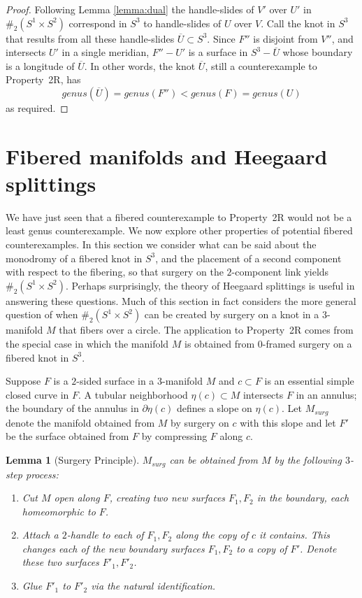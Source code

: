 \documentclass{amsart}
\newtheorem{lemma}[thm]{Lemma}
\newcommand{\bdd}{\mbox{$\partial$}}
\begin{document}
\begin{proof}
Following Lemma \ref{lemma:dual} the handle-slides of $V'$ over $U'$ in $\#_{2} (S^{1} \times S^{2})$ correspond in $S^3$ to handle-slides of $U$ over $V$.  Call the knot in $S^3$ that results from all these handle-slides $\overline{U} \subset S^3$.  Since $F''$ is disjoint from $V''$, and intersects $U'$ in a single meridian, $F'' - U'$ is a surface in $S^3 - \overline{U}$ whose boundary is a longitude of $\overline{U}$.  In other words, the knot $\overline{U}$, still a counterexample to Property~2R, has $$genus(\overline{U}) = genus(F'') < genus(F) = genus(U)$$ as required.
\end{proof}

\section{Fibered manifolds and Heegaard splittings} \label{Sect:Heeg}

We have just seen that a fibered counterexample to Property~2R would not be a least genus counterexample.  We now explore other properties of potential fibered counterexamples.  In this section we consider what can be said about the monodromy of a fibered knot in $S^3$, and the placement of a second component with respect to the fibering, so that surgery on the $2$-component link yields $\#_{2} (S^{1} \times S^{2})$.  Perhaps surprisingly, the theory of Heegaard splittings is useful in answering these questions.  Much of this section in fact considers the more general question of when $\#_{2} (S^{1} \times S^{2})$ can be created by surgery on a knot in a $3$-manifold $M$ that fibers over a circle.  The application to Property~2R comes from the special case in which the manifold $M$ is obtained from $0$-framed surgery on a fibered knot in $S^3$.

Suppose $F$ is a $2$-sided surface in a $3$-manifold $M$ and $c \subset F$ is an essential simple closed curve in $F$.  A tubular neighborhood $\eta(c) \subset M$ intersects $F$ in an annulus; the boundary of the annulus in $\bdd \eta(c)$ defines a slope on $\eta(c)$.  Let $M_{surg}$ denote the manifold obtained from $M$ by surgery on $c$ with this slope and let $F'$ be the surface obtained from $F$ by compressing $F$ along $c$.

\begin{lemma}[Surgery Principle] \label{lemma:surgprin}  $M_{surg}$ can be obtained from $M$ by the following $3$-step process:
\begin{enumerate}
\item Cut $M$ open along $F$, creating two new surfaces $F_1, F_2$ in the boundary, each homeomorphic to $F$.
\item Attach a $2$-handle to each of $F_1, F_2$ along the copy of $c$ it contains.  This changes each of the new boundary surfaces $F_1, F_2$ to a copy of $F'$.  Denote these two surfaces $F'_1, F'_2$.
\item Glue $F'_1$ to $F'_2$ via the natural identification.
\end{enumerate}
\end{lemma}
\end{document}
